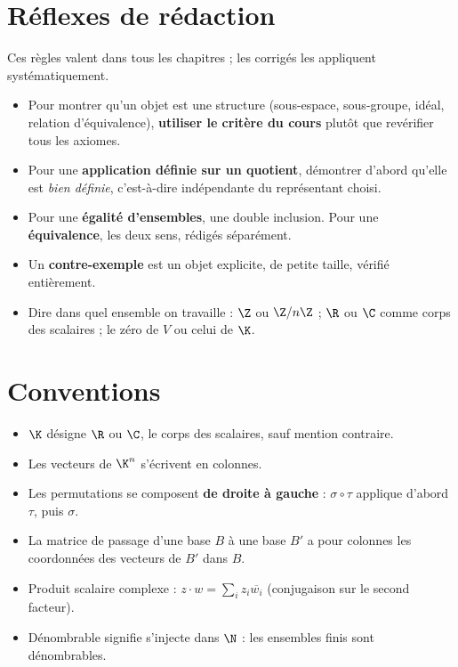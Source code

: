 \section{Réflexes de rédaction}
Ces règles valent dans tous les chapitres ; les corrigés les appliquent systématiquement.
\begin{itemize}
\item Pour montrer qu'un objet est une structure (sous-espace, sous-groupe, idéal, relation d'équivalence), \textbf{utiliser le critère du cours} plutôt que revérifier tous les axiomes.
\item Pour une \textbf{application définie sur un quotient}, démontrer d'abord qu'elle est \emph{bien définie}, c'est-à-dire indépendante du représentant choisi.
\item Pour une \textbf{égalité d'ensembles}, une double inclusion. Pour une \textbf{équivalence}, les deux sens, rédigés séparément.
\item Un \textbf{contre-exemple} est un objet explicite, de petite taille, vérifié entièrement.
\item Dire dans quel ensemble on travaille : $\Z$ ou $\Z/n\Z$ ; $\R$ ou $\C$ comme corps des scalaires ; le zéro de $V$ ou celui de $\K$.
\end{itemize}

\section{Conventions}
\begin{itemize}
\item $\K$ désigne $\R$ ou $\C$, le corps des scalaires, sauf mention contraire.
\item Les vecteurs de $\K^n$ s'écrivent en colonnes.
\item Les permutations se composent \textbf{de droite à gauche} : $\sigma\circ\tau$ applique d'abord $\tau$, puis $\sigma$.
\item La matrice de passage d'une base $B$ à une base $B'$ a pour colonnes les coordonnées des vecteurs de $B'$ dans $B$.
\item Produit scalaire complexe : $z\cdot w=\sum_i z_i\overline{w_i}$ (conjugaison sur le second facteur).
\item \og Dénombrable \fg{} signifie \og s'injecte dans $\N$ \fg{} : les ensembles finis sont dénombrables.
\end{itemize}
